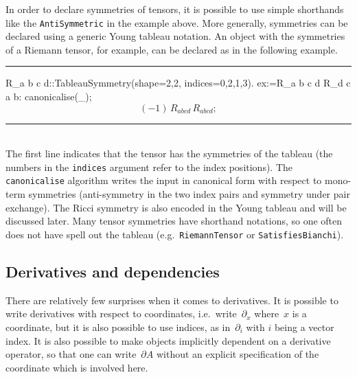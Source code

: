 \documentclass[11pt]{article}
\newcommand{\toprule}{\par\vspace{1ex}\noindent\hspace{25pt}\rule{435pt}{.1pt}}
\newcommand{\botrule}{\noindent\hspace{25pt}\rule{435pt}{.1pt}\\[2ex]}
\newenvironment{cdbin}{\fvset{firstnumber=1}\color[named]{Blue}\Verbatim}{\endVerbatim}
\newenvironment{cdbout}{\vspace{-1.4ex}\begin{equation}}{\end{equation}\vspace{-1.4ex}}
\begin{document}
In order to declare symmetries of tensors, it is possible to use
simple shorthands like the \verb|AntiSymmetric| in the example above. 
More generally, symmetries can be declared using  a generic Young
tableau notation. An object with the symmetries of a Riemann tensor,
for example, can be declared as in the following example.
\toprule
\begin{cdbin}
R_{a b c d}::TableauSymmetry(shape={2,2}, indices={0,2,1,3}).
ex:=R_{a b c d} R_{d c a b}:
canonicalise(_);
\end{cdbin}
\begin{cdbout}
(-1)\, R_{a b c d}\, R_{a b c d};
\end{cdbout}
\botrule
The first line indicates that the tensor has the symmetries of the
 tableau (the numbers in the \verb|indices| argument
refer to the index positions). The \verb|canonicalise| algorithm writes
the input in canonical form with respect to mono-term symmetries
(anti-symmetry in the two index pairs and symmetry under pair
exchange). The Ricci symmetry is also encoded in the Young tableau and
will be discussed later. Many tensor symmetries have shorthand
notations, so one often does not have spell out the tableau (e.g.~\verb|RiemannTensor| or \verb|SatisfiesBianchi|).

\subsection{Derivatives and dependencies}
\label{s:derivatives}

There are relatively few surprises when it comes to derivatives.
It is possible to write derivatives with respect to coordinates,
i.e.~write~$\partial_x$ where~$x$ is a coordinate, but
it is also possible to use indices, as in~$\partial_i$ with $i$ being
a vector index. It is also possible to make objects implicitly
dependent on a derivative operator, so that one can write~$\partial
A$ without an explicit specification of the coordinate which is
involved here. 
\end{document}
